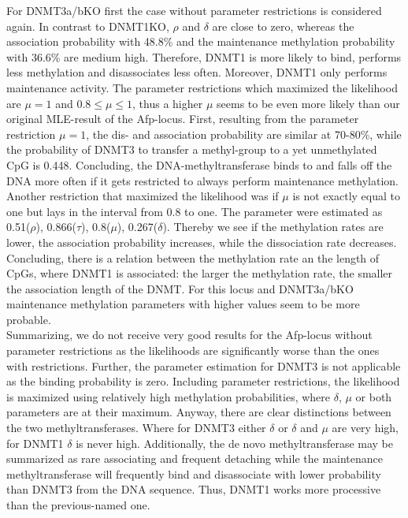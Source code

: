 For DNMT3a/bKO first the case without parameter restrictions is considered again. In contrast to DNMT1KO, $\rho$ and $\delta$ are close to zero, whereas the association probability with 48.8\% and the maintenance methylation probability with 36.6\% are medium high. Therefore, DNMT1 is more likely to bind, performs less methylation and disassociates less often. Moreover, DNMT1 only performs maintenance activity.\newline
The parameter restrictions which maximized the likelihood are $\mu = 1$ and $0.8 \leq \mu \leq 1$, thus a higher $\mu$ seems to be even more likely than our original \ac{MLE}-result of the Afp-locus. First, resulting from the parameter restriction $\mu = 1$, the dis- and association probability are similar at 70-80\%, while the probability of DNMT3 to transfer a methyl-group to a yet unmethylated \ac{CpG} is 0.448. Concluding, the DNA-methyltransferase binds to and falls off the DNA more often if it gets restricted to always perform maintenance methylation. Another restriction that maximized the likelihood was if $\mu$ is not exactly equal to one but lays in the interval from 0.8 to one. The parameter were estimated as 0.51($\rho$), 0.866($\tau$), 0.8($\mu$), 0.267($\delta$). Thereby we see if the methylation rates are lower, the association probability increases, while the dissociation rate decreases. Concluding, there is a relation between the methylation rate an the length of \acp{CpG}, where DNMT1 is associated: the larger the methylation rate, the smaller the association length of the \ac{DNMT}. For this locus and DNMT3a/bKO maintenance methylation parameters with higher values seem to be more probable.\\

Summarizing, we do not receive very good results for the Afp-locus without parameter restrictions as the likelihoods are significantly worse than the ones with restrictions. Further, the parameter estimation for DNMT3 is not applicable as the binding probability is zero. Including parameter restrictions, the likelihood is maximized using relatively high methylation probabilities, where $\delta$, $\mu$ or both parameters are at their maximum. Anyway, there are clear distinctions between the two methyltransferases. Where for DNMT3 either $\delta$ or $\delta$ and $\mu$ are very high, for DNMT1 $\delta$ is never high. Additionally, the de novo methyltransferase may be summarized as rare associating and frequent detaching while the maintenance methyltransferase will frequently bind and disassociate with lower probability than DNMT3 from the DNA sequence. Thus, DNMT1 works more processive than the previous-named one.

